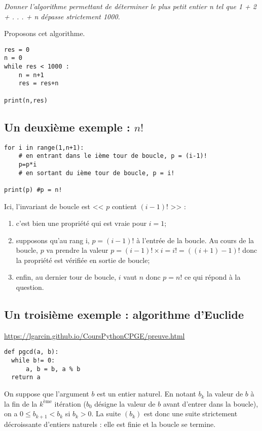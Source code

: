 \textit{Donner l'algorithme permettant de déterminer le plus petit entier n tel que 1 + 2 + . . . + n dépasse strictement 1000.}

Proposons cet algorithme.
\begin{lstlisting}
res = 0
n = 0
while res < 1000 : 
    n = n+1
    res = res+n
    
print(n,res)
\end{lstlisting}

\subsection{Un deuxième exemple : $n!$}

\begin{lstlisting}
for i in range(1,n+1):
    # en entrant dans le ième tour de boucle, p = (i-1)!
    p=p*i
    # en sortant du ième tour de boucle, p = i!

print(p) #p = n!
\end{lstlisting}

Ici, l'invariant de boucle est << $p$ contient $(i-1)!$ >> : 
\begin{enumerate}
\item c'est bien une propriété qui est vraie pour $i=1$;
\item supposons qu'au rang i, $p=(i-1)!$ à l'entrée de la boucle. Au cours de la boucle, $p$ va prendre la valeur $p=(i-1)!\times i=i!=((i+1)-1)!$ donc la propriété est vérifiée en sortie de boucle;
\item enfin, au dernier tour de boucle, $i$ vaut $n$ donc $p=n!$ ce qui répond à la question.\\
\end{enumerate}

\subsection{Un troisième exemple : algorithme d'Euclide}
\url{https://lgarcin.github.io/CoursPythonCPGE/preuve.html}

\begin{lstlisting}
def pgcd(a, b):
  while b!= 0:
      a, b = b, a % b
  return a
\end{lstlisting}

On suppose que l'argument $b$ est un entier naturel. En notant $b_k$ la valeur de $b$ à la fin de la $k^\text{ème}$ itération ($b_0$ désigne la valeur de $b$ avant d'entrer dans la boucle), on a $0\leq b_{k+1}<b_k$ si $b_k>0$. La suite $(b_k)$ est donc une suite strictement décroissante d'entiers naturels : elle est finie et la boucle se termine.


